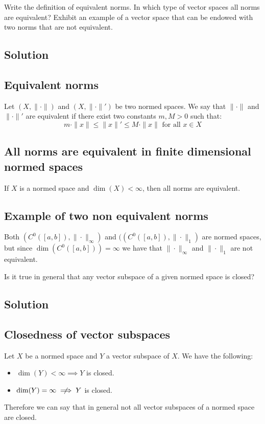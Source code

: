 \question
Write the definition of equivalent norms. In which type of vector spaces all norms are equivalent? Exhibit an example of a vector space that can be endowed with two norms that are not equivalent.

\subsection*{Solution}

\subsection{Equivalent norms}
Let $(X,\|\cdot\|)$ and $(X,\|\cdot\|')$ be two normed spaces. We say that $\|\cdot\|$ and $\|\cdot\|'$ are equivalent if there exist two constants $m,M>0$ such that:
\[ m \cdot \|x\| \leq \|x\|' \leq M \cdot \|x\| \text{ for all } x \in X \]

\subsection{All norms are equivalent in finite dimensional normed spaces}
If $X$ is a normed space and $\dim(X)<\infty$, then all norms are equivalent.

\subsection{Example of two non equivalent norms}
Both $(C^0([a,b]),\| \cdot\|_\infty)$ and $((C^0([a,b]),\| \cdot\|_1)$ are normed spaces, but since $\dim(C^0([a,b]))=\infty$ we have that $\| \cdot\|_\infty$ and $\| \cdot\|_1$ are not equivalent.


\question
Is it true in general that any vector subspace of a given normed space is closed?

\subsection*{Solution}

\subsection{Closedness of vector subspaces}
Let $X$ be a normed space and $Y$ a vector subspace of $X$. We have the following:
\begin{itemize}
    \item $\dim(Y) < \infty \implies Y$ is closed.
    \item $\dim(Y) = \infty \centernot\implies Y$ is closed.
\end{itemize}
Therefore we can say that in general not all vector subspaces of a normed space are closed.

